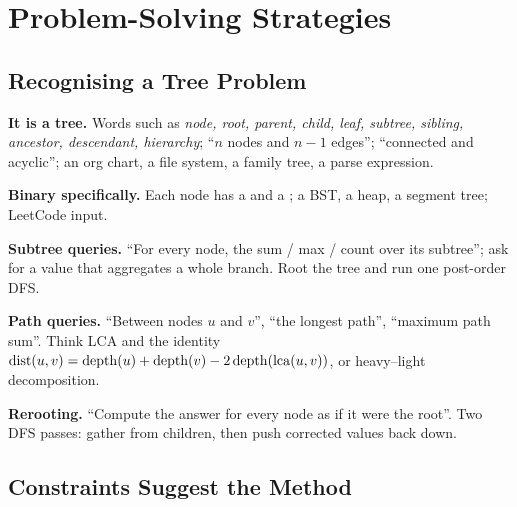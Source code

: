 \chapter{Problem-Solving Strategies}\label{ch:app-strategies}

\section{Recognising a Tree Problem}

\begin{tcolorbox}[mathbase, colback=lightgray, colframe=primaryblue, title={Problem indicators}, colbacktitle=primaryblue]
\textbf{It is a tree.} Words such as \emph{node, root, parent, child, leaf, subtree,
sibling, ancestor, descendant, hierarchy}; ``$n$ nodes and $n-1$ edges''; ``connected
and acyclic''; an org chart, a file system, a family tree, a parse expression.

\textbf{Binary specifically.} Each node has a  and a ; a BST,
a heap, a segment tree; LeetCode  input.

\textbf{Subtree queries.} ``For every node, the sum / max / count over its subtree'';
ask for a value that aggregates a whole branch. Root the tree and run one post-order
DFS.

\textbf{Path queries.} ``Between nodes $u$ and $v$'', ``the longest path'', ``maximum
path sum''. Think LCA and the identity
$\operatorname{dist}(u,v)=\operatorname{depth}(u)+\operatorname{depth}(v)-2\operatorname{depth}(\operatorname{lca}(u,v))$, or heavy--light decomposition.

\textbf{Rerooting.} ``Compute the answer for every node as if it were the root''.
Two DFS passes: gather from children, then push corrected values back down.
\end{tcolorbox}

\section{Constraints Suggest the Method}

